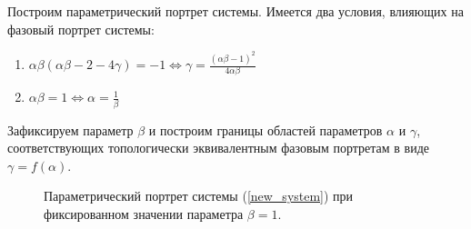 \documentclass[10pt]{article}
\numberwithin{equation}{section}
\begin{document}
Построим параметрический портрет системы. Имеется два условия, влияющих на фазовый портрет системы:
\begin{enumerate}
	\item \( \alpha \beta ( \alpha \beta - 2 - 4 \gamma) = -1 \iff \gamma = \frac{(\alpha \beta - 1)^2}{4 \alpha \beta} \)
	\item \( \alpha \beta = 1 \iff \alpha = \frac{1}{\beta} \)
\end{enumerate}
Зафиксируем параметр \( \beta \) и построим границы областей параметров \( \alpha \) и  \( \gamma \), соответствующих топологически эквивалентным фазовым портретам в виде \( \gamma = f(\alpha) \).

\begin{figure}[h]
	\caption{Параметрический портрет системы (\ref{new_system}) при фиксированном значении параметра \( \beta = 1 \).}
\end{figure}
\end{document}
